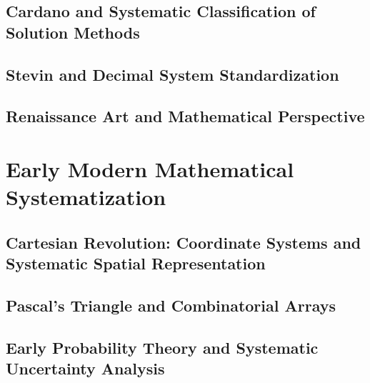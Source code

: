 \documentclass[12pt, oneside, openany]{book}
\let\oldchapter\chapter
\renewcommand{\chapter}{
	\cleardoublepage
	\thispagestyle{chapter}
	\oldchapter
}
\begin{document}
\section{Cardano and Systematic Classification of Solution Methods}

\section{Stevin and Decimal System Standardization}

\section{Renaissance Art and Mathematical Perspective}


\chapter{Early Modern Mathematical Systematization}

\section{Cartesian Revolution: Coordinate Systems and Systematic Spatial Representation}

\section{Pascal's Triangle and Combinatorial Arrays}

\section{Early Probability Theory and Systematic Uncertainty Analysis}
\end{document}
